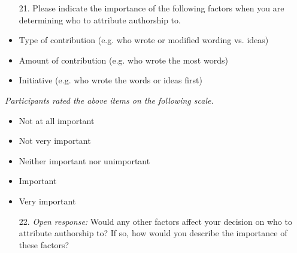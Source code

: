 \begin{itemize}[leftmargin=0pt, itemindent=2em]
    \item[21.] Please indicate the importance of the following factors when you are determining who to attribute authorship to.
    \item Type of contribution (e.g. who wrote or modified wording vs. ideas)
    \item Amount of contribution (e.g. who wrote the most words)
    \item Initiative (e.g. who wrote the words or ideas first)
\end{itemize}

\textit{Participants rated the above items on the following scale.}

\begin{itemize}
    \item Not at all important
    \item Not very important
    \item Neither important nor unimportant
    \item Important
    \item Very important
\end{itemize}

\begin{itemize}[leftmargin=0pt, itemindent=2em]
    \item[22.] \textit{Open response:} Would any other factors affect your decision on who to attribute authorship to? If so, how would you describe the importance of these factors? 
\end{itemize}




    
     
